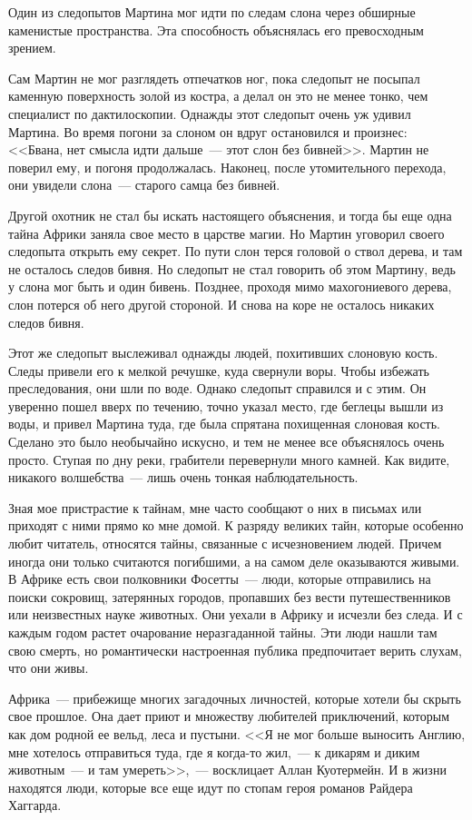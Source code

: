 \documentclass[12pt,a4paper,twoside,openany,svgnames]{memoir}
\begin{document}
Один из следопытов Мартина мог идти по следам слона через обширные каменистые пространства. Эта способность объяснялась его превосходным зрением.

Сам Мартин не мог разглядеть отпечатков ног, пока следопыт не посыпал каменную поверхность золой из костра, а делал он это не менее тонко, чем специалист по дактилоскопии. Однажды этот следопыт очень уж удивил Мартина. Во время погони за слоном он вдруг остановился и произнес: <<Бвана, нет смысла идти дальше~--- этот слон без бивней>>. Мартин не поверил ему, и погоня продолжалась. Наконец, после утомительного перехода, они увидели слона~--- старого самца без бивней.

Другой охотник не стал бы искать настоящего объяснения, и тогда бы еще одна тайна Африки заняла свое место в царстве магии. Но Мартин уговорил своего следопыта открыть ему секрет. По пути слон терся головой о ствол дерева, и там не осталось следов бивня. Но следопыт не стал говорить об этом Мартину, ведь у слона мог быть и один бивень. Позднее, проходя мимо махогониевого дерева, слон потерся об него другой стороной. И снова на коре не осталось никаких следов бивня.

Этот же следопыт выслеживал однажды людей, похитивших слоновую кость. Следы привели его к мелкой речушке, куда свернули воры. Чтобы избежать преследования, они шли по воде. Однако следопыт справился и с этим. Он уверенно пошел вверх по течению, точно указал место, где беглецы вышли из воды, и привел Мартина туда, где была спрятана похищенная слоновая кость. Сделано это было необычайно искусно, и тем не менее все объяснялось очень просто. Ступая по дну реки, грабители перевернули много камней. Как видите, никакого волшебства~--- лишь очень тонкая наблюдательность.

Зная мое пристрастие к тайнам, мне часто сообщают о них в письмах или приходят с ними прямо ко мне домой. К разряду великих тайн, которые особенно любит читатель, относятся тайны, связанные с исчезновением людей. Причем иногда они только считаются погибшими, а на самом деле оказываются живыми. В Африке есть свои полковники Фосетты~--- люди, которые отправились на поиски сокровищ, затерянных городов, пропавших без вести путешественников или неизвестных науке животных. Они уехали в Африку и исчезли без следа. И с каждым годом растет очарование неразгаданной тайны. Эти люди нашли там свою смерть, но романтически настроенная публика предпочитает верить слухам, что они живы.

Африка~--- прибежище многих загадочных личностей, которые хотели бы скрыть свое прошлое. Она дает приют и множеству любителей приключений, которым как дом родной ее вельд, леса и пустыни. <<Я не мог больше выносить Англию, мне хотелось отправиться туда, где я когда-то жил,~--- к дикарям и диким животным~--- и там умереть>>,~--- восклицает Аллан Куотермейн. И в жизни находятся люди, которые все еще идут по стопам героя романов Райдера Хаггарда.
\end{document}
